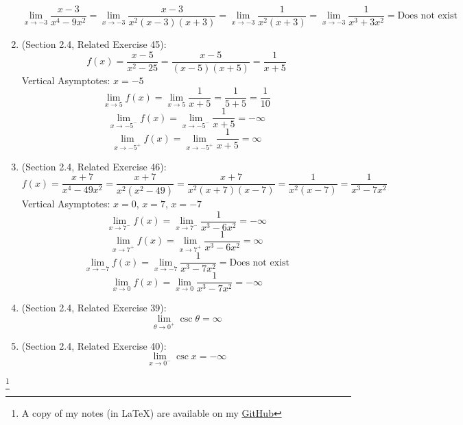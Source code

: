 \documentclass{article}
\newcommand\blfootnote[1]{
    \begingroup
    \renewcommand\thefootnote{}\footnote{#1}
    \addtocounter{footnote}{-1}
    \endgroup
}
\begin{document}
\begin{enumerate}
		$$\lim_{x \to -3}{\frac{x - 3}{x^4 - 9x^2}} = \lim_{x \to -3}{\frac{x - 3}{x^2(x-3)(x+3)}} = \lim_{x \to -3}{\frac{1}{x^2(x+3)}} = \lim_{x \to -3}{\frac{1}{x^3+3x^2}} = \text{Does not exist}$$
	\item (Section 2.4, Related Exercise 45):
		$$f(x) = \frac{x-5}{x^2 - 25} = \frac{x-5}{(x-5)(x+5)} = \frac{1}{x+5}$$
		Vertical Asymptotes: $x=-5$
		$$\lim_{x \to 5}{f(x)} = \lim_{x \to 5}{\frac{1}{x+5}} = \frac{1}{5+5} = \frac{1}{10}$$
		$$\lim_{x \to -5^-}{f(x)} = \lim_{x \to -5^-}{\frac{1}{x+5}} = - \infty$$
		$$\lim_{x \to -5^+}{f(x)} = \lim_{x \to -5^+}{\frac{1}{x+5}} = \infty$$
	\item (Section 2.4, Related Exercise 46):
		$$f(x) = \frac{x+7}{x^4 - 49x^2} = \frac{x+7}{x^2(x^2 - 49)} = \frac{x+7}{x^2(x+7)(x-7)} = \frac{1}{x^2(x-7)} = \frac{1}{x^3 - 7x^2}$$
		Vertical Asymptotes: $x = 0$, $x = 7$, $x = -7$
		$$\lim_{x \to 7^-}{f(x)} = \lim_{x \to 7^-}{\frac{1}{x^3 - 6x^2}} = - \infty$$
		$$\lim_{x \to 7^+}{f(x)} = \lim_{x \to 7^+}{\frac{1}{x^3 - 6x^2}} = \infty$$
		$$\lim_{x \to -7}{f(x)} = \lim_{x \to -7}{\frac{1}{x^3 - 7x^2}} = \text{Does not exist}$$
		$$\lim_{x \to 0}{f(x)} = \lim_{x \to 0}{\frac{1}{x^3 - 7x^2}} = - \infty$$
	\item (Section 2.4, Related Exercise 39):
		$$\lim_{\theta \to 0^+}{\csc{\theta}} = \infty$$
	\item (Section 2.4, Related Exercise 40):
		$$\lim_{x \to 0^-}{\csc{x}} = - \infty$$
\end{enumerate}
\blfootnote{A copy of my notes (in \LaTeX) are available on my \href{https://github.com/onlinechronically/MATH-211}{GitHub}}
\end{document}
